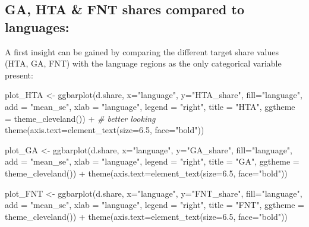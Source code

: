 \documentclass[
]{article}
\newenvironment{Shaded}{\begin{snugshade}}{\end{snugshade}}
\newcommand{\AttributeTok}[1]{\textcolor[rgb]{0.77,0.63,0.00}{#1}}
\newcommand{\CommentTok}[1]{\textcolor[rgb]{0.56,0.35,0.01}{\textit{#1}}}
\newcommand{\FloatTok}[1]{\textcolor[rgb]{0.00,0.00,0.81}{#1}}
\newcommand{\FunctionTok}[1]{\textcolor[rgb]{0.00,0.00,0.00}{#1}}
\newcommand{\NormalTok}[1]{#1}
\newcommand{\OtherTok}[1]{\textcolor[rgb]{0.56,0.35,0.01}{#1}}
\newcommand{\SpecialCharTok}[1]{\textcolor[rgb]{0.00,0.00,0.00}{#1}}
\newcommand{\StringTok}[1]{\textcolor[rgb]{0.31,0.60,0.02}{#1}}
\begin{document}
\newpage

\hypertarget{ga-hta-fnt-shares-compared-to-languages}{%
\subsection{GA, HTA \& FNT shares compared to
languages:}\label{ga-hta-fnt-shares-compared-to-languages}}

A first insight can be gained by comparing the different target share
values (HTA, GA, FNT) with the language regions as the only categorical
variable present:

\begin{Shaded}
\begin{Highlighting}[]
\NormalTok{plot\_HTA }\OtherTok{\textless{}{-}} \FunctionTok{ggbarplot}\NormalTok{(d.share, }\AttributeTok{x=}\StringTok{"language"}\NormalTok{, }\AttributeTok{y=}\StringTok{"HTA\_share"}\NormalTok{, }\AttributeTok{fill=}\StringTok{"language"}\NormalTok{,  }
                      \AttributeTok{add =} \StringTok{"mean\_se"}\NormalTok{, }\AttributeTok{xlab =} \StringTok{"language"}\NormalTok{, }\AttributeTok{legend =} \StringTok{"right"}\NormalTok{,}
                      \AttributeTok{title =} \StringTok{"HTA"}\NormalTok{, }\AttributeTok{ggtheme =} \FunctionTok{theme\_cleveland}\NormalTok{()) }\SpecialCharTok{+} \CommentTok{\# better looking}
  \FunctionTok{theme}\NormalTok{(}\AttributeTok{axis.text=}\FunctionTok{element\_text}\NormalTok{(}\AttributeTok{size=}\FloatTok{6.5}\NormalTok{, }\AttributeTok{face=}\StringTok{"bold"}\NormalTok{))}

\NormalTok{plot\_GA }\OtherTok{\textless{}{-}} \FunctionTok{ggbarplot}\NormalTok{(d.share, }\AttributeTok{x=}\StringTok{"language"}\NormalTok{, }\AttributeTok{y=}\StringTok{"GA\_share"}\NormalTok{, }\AttributeTok{fill=}\StringTok{"language"}\NormalTok{, }\AttributeTok{add =} \StringTok{"mean\_se"}\NormalTok{,}
                      \AttributeTok{xlab =} \StringTok{"language"}\NormalTok{, }\AttributeTok{legend =} \StringTok{"right"}\NormalTok{, }
                     \AttributeTok{title =} \StringTok{"GA"}\NormalTok{, }\AttributeTok{ggtheme =} \FunctionTok{theme\_cleveland}\NormalTok{()) }\SpecialCharTok{+}
  \FunctionTok{theme}\NormalTok{(}\AttributeTok{axis.text=}\FunctionTok{element\_text}\NormalTok{(}\AttributeTok{size=}\FloatTok{6.5}\NormalTok{, }\AttributeTok{face=}\StringTok{"bold"}\NormalTok{))}

\NormalTok{plot\_FNT }\OtherTok{\textless{}{-}} \FunctionTok{ggbarplot}\NormalTok{(d.share, }\AttributeTok{x=}\StringTok{"language"}\NormalTok{, }\AttributeTok{y=}\StringTok{"FNT\_share"}\NormalTok{, }\AttributeTok{fill=}\StringTok{"language"}\NormalTok{, }
                      \AttributeTok{add =} \StringTok{"mean\_se"}\NormalTok{, }\AttributeTok{xlab =} \StringTok{"language"}\NormalTok{, }\AttributeTok{legend =} \StringTok{"right"}\NormalTok{,}
                      \AttributeTok{title =} \StringTok{"FNT"}\NormalTok{, }\AttributeTok{ggtheme =} \FunctionTok{theme\_cleveland}\NormalTok{()) }\SpecialCharTok{+}
  \FunctionTok{theme}\NormalTok{(}\AttributeTok{axis.text=}\FunctionTok{element\_text}\NormalTok{(}\AttributeTok{size=}\FloatTok{6.5}\NormalTok{, }\AttributeTok{face=}\StringTok{"bold"}\NormalTok{))}


\end{Highlighting}
\end{Shaded}
\end{document}
